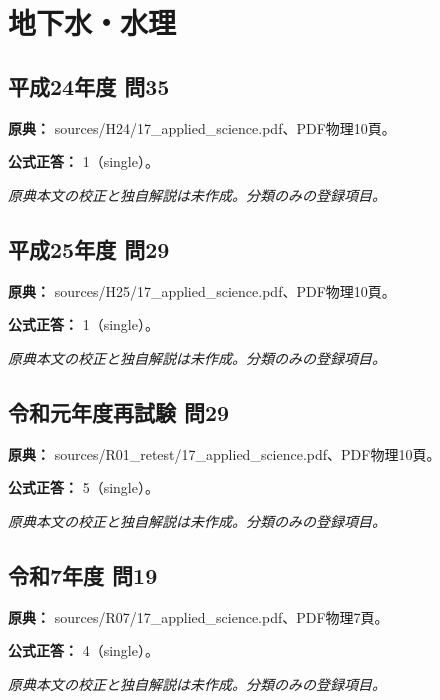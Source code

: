 \section{地下水・水理}

\subsection{平成24年度 問35}
\label{q:h24-reg-applied-35}

\noindent\textbf{原典：} sources/H24/17\_applied\_science.pdf、PDF物理10頁。

\textbf{公式正答：} 1（single）。

\par\textit{原典本文の校正と独自解説は未作成。分類のみの登録項目。}

\subsection{平成25年度 問29}
\label{q:h25-reg-applied-29}

\noindent\textbf{原典：} sources/H25/17\_applied\_science.pdf、PDF物理10頁。

\textbf{公式正答：} 1（single）。

\par\textit{原典本文の校正と独自解説は未作成。分類のみの登録項目。}

\subsection{令和元年度再試験 問29}
\label{q:r01-ret-applied-29}

\noindent\textbf{原典：} sources/R01\_retest/17\_applied\_science.pdf、PDF物理10頁。

\textbf{公式正答：} 5（single）。

\par\textit{原典本文の校正と独自解説は未作成。分類のみの登録項目。}

\subsection{令和7年度 問19}
\label{q:r07-reg-applied-19}

\noindent\textbf{原典：} sources/R07/17\_applied\_science.pdf、PDF物理7頁。

\textbf{公式正答：} 4（single）。

\par\textit{原典本文の校正と独自解説は未作成。分類のみの登録項目。}
